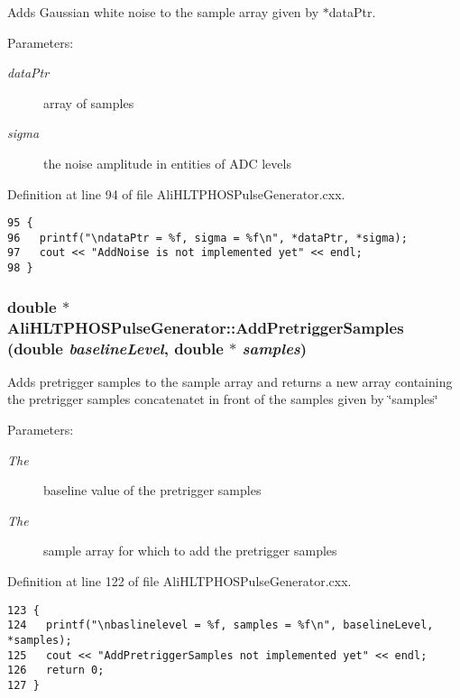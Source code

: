 Adds Gaussian white noise to the sample array given by $\ast$data\-Ptr. \begin{Desc}
\item[Parameters:]
\begin{description}
\item[{\em data\-Ptr}]array of samples \item[{\em sigma}]the noise amplitude in entities of ADC levels \end{description}
\end{Desc}


Definition at line 94 of file Ali\-HLTPHOSPulse\-Generator.cxx.

\footnotesize\begin{verbatim}95 {
96   printf("\ndataPtr = %f, sigma = %f\n", *dataPtr, *sigma);
97   cout << "AddNoise is not implemented yet" << endl;
98 }
\end{verbatim}\normalsize 


\subsubsection{\setlength{\rightskip}{0pt plus 5cm}double $\ast$ Ali\-HLTPHOSPulse\-Generator::Add\-Pretrigger\-Samples (double {\em baseline\-Level}, double $\ast$ {\em samples})}\label{classAliHLTPHOSPulseGenerator_AliHLTPHOSPulseGeneratora8}


Adds pretrigger samples to the sample array and returns a new array containing the pretrigger samples concatenatet in front of the samples given by \char`\"{}samples\char`\"{} \begin{Desc}
\item[Parameters:]
\begin{description}
\item[{\em The}]baseline value of the pretrigger samples \item[{\em The}]sample array for which to add the pretrigger samples \end{description}
\end{Desc}


Definition at line 122 of file Ali\-HLTPHOSPulse\-Generator.cxx.

\footnotesize\begin{verbatim}123 {
124   printf("\nbaslinelevel = %f, samples = %f\n", baselineLevel, *samples);
125   cout << "AddPretriggerSamples not implemented yet" << endl;
126   return 0;
127 }
\end{verbatim}\normalsize 


